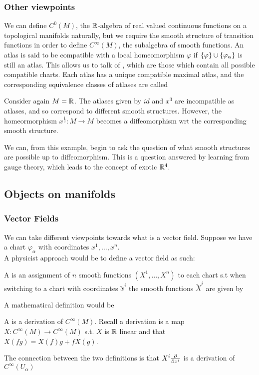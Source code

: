 \documentclass{article}
\begin{document}
\subsubsection{Other viewpoints}
We can define $C^0(M)$, the $\mathbb{R}$-algebra of real valued continuous functions on a topological manifolds naturally, but we require the smooth structure of transition functions in order to define $C^\infty(M)$, the subalgebra of smooth functions. An atlas is said to be compatible with a local homeomorphism $\varphi$ if $\left\{ \varphi \right\} \cup \left\{ \varphi_\alpha \right\}$ is still an atlas. This allows us to talk of , which are those which contain all possible compatible charts. Each atlas has a unique compatible maximal atlas, and the corresponding equivalence classes of atlases are called 

\begin{example}
Consider again $M = \mathbb{R}$. The atlases given by $id$ and $x^3$ are incompatible as atlases, and so correspond to different smooth structures. However, the homeormorphism $x^\frac{1}{3}:M \to M$ becomes a diffeomorphism wrt the corresponding smooth structure.
\end{example}
We can, from this example, begin to ask the question of what smooth structures are possible up to diffeomorphism. This is a question answered by learning from gauge theory, which leads to the concept of exotic $\mathbb{R}^4$. 

\subsection{Objects on manifolds}

\subsubsection{Vector Fields}
We can take different viewpoints towards what is a vector field. Suppose we have a chart $\varphi_\alpha$ with coordinates $x^1, \dots, x^n$. \\
A physicist approach would be to define a vector field as such:
\begin{definition}
A  is an assignment of $n$ smooth functions $(X^1, \dots, X^n)$ to each chart s.t when switching to a chart with coordinates $\tilde{x}^i$ the smooth functions $\tilde{X}^i$ are given by 
\end{definition}
A mathematical definition would be
\begin{definition}
 A  is a derivation of $C^\infty(M)$. Recall a derivation is a map $X:C^\infty(M) \to C^\infty(M)$ s.t. $X$ is $\mathbb{R}$ linear and that $X(fg) = X(f)g + fX(g)$. 
 \end{definition}
The connection between the two definitions is that $X^i \frac{\partial}{\partial x^i}$ is a derivation of $C^\infty(U_\alpha)$
\end{document}
